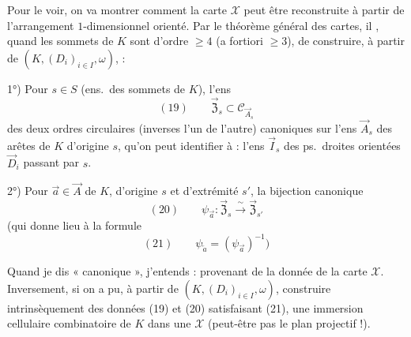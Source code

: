 \documentclass[11pt,a4paper]{article}
\begin{document}
Pour le voir, on va montrer comment la carte $\mathcal{X}$ peut être reconstruite à partir de l'arrangement $1$-dimensionnel orienté. Par le théorème général des cartes, il , quand les sommets de $K$ sont d'ordre $\geqslant 4$ (a fortiori $\geqslant 3$), de construire, à partir de $(K, (D_i)_{i \in I}, \omega)$, :

1°) Pour  $s \in S$ (ens.\ des sommets de $K$), l'ens
\[
(19) \qquad \vec{\mathfrak{Z}}_s \subset \mathcal{C}_{\vec{A}_s}
\]
des deux ordres circulaires (inverses l'un de l'autre) canoniques sur l'ens $\vec{A}_s$ des arêtes \struck{\ill{}} de $K$ d'origine $s$, qu'on peut identifier à : l'ens $\vec{I}_s$ des ps.\ droites orientées $\vec{D}_i$ passant par $s$.

2°) Pour  $\vec{a} \in \vec{A}$ de $K$, d'origine $s$ et d'extrémité $s'$, la bijection canonique
\[
(20) \qquad \psi_{\vec{a}} : \vec{\mathfrak{Z}}_s \xrightarrow{\ \sim\ } \vec{\mathfrak{Z}}_{s'}
\]
(qui donne lieu à la formule
\[
(21) \qquad \psi_{\overleftarrow{a}} = (\psi_{\vec{a}})^{-1} \text{)}
\]

Quand je dis « canonique », j'entends : provenant de la donnée de la carte $\mathcal{X}$. Inversement, si on a pu, à partir de $(K, (D_i)_{i \in I}, \omega)$, construire intrinsèquement des données (19) et (20) satisfaisant (21),  une immersion cellulaire combinatoire de $K$ dans une $\mathcal{X}$ (peut-être pas le plan projectif !).
\end{document}
